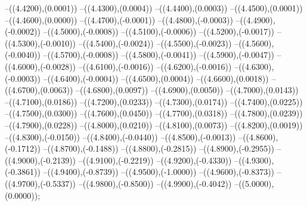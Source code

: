 {	--({\sx*(4.4200)},{\sy*(0.0001)})
	--({\sx*(4.4300)},{\sy*(0.0004)})
	--({\sx*(4.4400)},{\sy*(0.0003)})
	--({\sx*(4.4500)},{\sy*(0.0001)})
	--({\sx*(4.4600)},{\sy*(0.0000)})
	--({\sx*(4.4700)},{\sy*(-0.0001)})
	--({\sx*(4.4800)},{\sy*(-0.0003)})
	--({\sx*(4.4900)},{\sy*(-0.0002)})
	--({\sx*(4.5000)},{\sy*(-0.0008)})
	--({\sx*(4.5100)},{\sy*(-0.0006)})
	--({\sx*(4.5200)},{\sy*(-0.0017)})
	--({\sx*(4.5300)},{\sy*(-0.0010)})
	--({\sx*(4.5400)},{\sy*(-0.0024)})
	--({\sx*(4.5500)},{\sy*(-0.0023)})
	--({\sx*(4.5600)},{\sy*(-0.0040)})
	--({\sx*(4.5700)},{\sy*(-0.0008)})
	--({\sx*(4.5800)},{\sy*(-0.0041)})
	--({\sx*(4.5900)},{\sy*(-0.0047)})
	--({\sx*(4.6000)},{\sy*(-0.0028)})
	--({\sx*(4.6100)},{\sy*(-0.0016)})
	--({\sx*(4.6200)},{\sy*(-0.0016)})
	--({\sx*(4.6300)},{\sy*(-0.0003)})
	--({\sx*(4.6400)},{\sy*(-0.0004)})
	--({\sx*(4.6500)},{\sy*(0.0004)})
	--({\sx*(4.6600)},{\sy*(0.0018)})
	--({\sx*(4.6700)},{\sy*(0.0063)})
	--({\sx*(4.6800)},{\sy*(0.0097)})
	--({\sx*(4.6900)},{\sy*(0.0050)})
	--({\sx*(4.7000)},{\sy*(0.0143)})
	--({\sx*(4.7100)},{\sy*(0.0186)})
	--({\sx*(4.7200)},{\sy*(0.0233)})
	--({\sx*(4.7300)},{\sy*(0.0174)})
	--({\sx*(4.7400)},{\sy*(0.0225)})
	--({\sx*(4.7500)},{\sy*(0.0300)})
	--({\sx*(4.7600)},{\sy*(0.0450)})
	--({\sx*(4.7700)},{\sy*(0.0318)})
	--({\sx*(4.7800)},{\sy*(0.0239)})
	--({\sx*(4.7900)},{\sy*(0.0228)})
	--({\sx*(4.8000)},{\sy*(0.0210)})
	--({\sx*(4.8100)},{\sy*(0.0073)})
	--({\sx*(4.8200)},{\sy*(0.0019)})
	--({\sx*(4.8300)},{\sy*(-0.0150)})
	--({\sx*(4.8400)},{\sy*(-0.0440)})
	--({\sx*(4.8500)},{\sy*(-0.0013)})
	--({\sx*(4.8600)},{\sy*(-0.1712)})
	--({\sx*(4.8700)},{\sy*(-0.1488)})
	--({\sx*(4.8800)},{\sy*(-0.2815)})
	--({\sx*(4.8900)},{\sy*(-0.2955)})
	--({\sx*(4.9000)},{\sy*(-0.2139)})
	--({\sx*(4.9100)},{\sy*(-0.2219)})
	--({\sx*(4.9200)},{\sy*(-0.4330)})
	--({\sx*(4.9300)},{\sy*(-0.3861)})
	--({\sx*(4.9400)},{\sy*(-0.8739)})
	--({\sx*(4.9500)},{\sy*(-1.0000)})
	--({\sx*(4.9600)},{\sy*(-0.8373)})
	--({\sx*(4.9700)},{\sy*(-0.5337)})
	--({\sx*(4.9800)},{\sy*(-0.8500)})
	--({\sx*(4.9900)},{\sy*(-0.4042)})
	--({\sx*(5.0000)},{\sy*(0.0000)});
}
